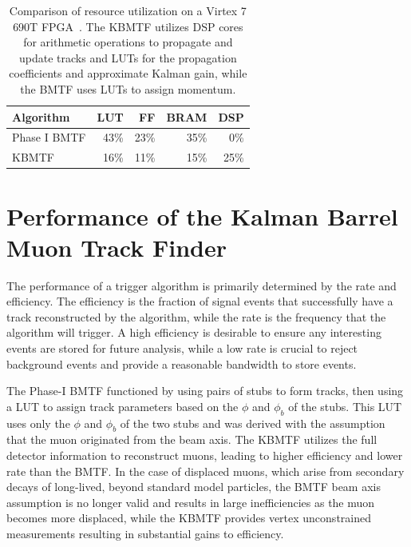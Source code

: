 \begin{table} [htb!]
	\centering
	\begin{tabular}{|l|r r r r|}
	\hline
	Algorithm & LUT & FF & BRAM & DSP \\
	\hline
	Phase I BMTF & 43\% & 23\% & 35\% & 0\%\\
	KBMTF & 16\% & 11\% & 15\% & 25\% \\
	\hline 
	\end{tabular}
	\caption[Comparison of resource utilization on a Virtex 7 690T FPGA. The KBMTF utilizes DSP cores for arithmetic operations to propagate and update tracks and LUTs for the propagation coefficients and approximate Kalman gain, while the BMTF uses LUTs to assign momentum.]
	{Comparison of resource utilization on a Virtex 7 690T FPGA~\cite{CERN-LHCC-2020-004}. The KBMTF utilizes DSP cores for arithmetic operations to propagate and update tracks and LUTs for the propagation coefficients and approximate Kalman gain, while the BMTF uses LUTs to assign momentum.}
	\label{tab:kmtfFW}
\end{table}

\section{Performance of the Kalman Barrel Muon Track Finder} \label{sec:kmtf_performance}
The performance of a trigger algorithm is primarily determined by the rate and efficiency. The efficiency is the fraction of signal events that successfully have a track reconstructed by the algorithm, while the rate is the frequency that the algorithm will trigger. A high efficiency is desirable to ensure any interesting events are stored for future analysis, while a low rate is crucial to reject background events and provide a reasonable bandwidth to store events.

The Phase-I BMTF functioned by using pairs of stubs to form tracks, then using a LUT to assign track parameters based on the $\phi$ and $\phi_b$ of the stubs. This LUT uses only the $\phi$ and $\phi_b$ of the two stubs and was derived with the assumption that the muon originated from the beam axis. The KBMTF utilizes the full detector information to reconstruct muons, leading to higher efficiency and lower rate than the BMTF. In the case of displaced muons, which arise from secondary decays of long-lived, beyond standard model particles, the BMTF beam axis assumption is no longer valid and results in large inefficiencies as the muon becomes more displaced, while the KBMTF provides vertex unconstrained measurements resulting in substantial gains to efficiency.

